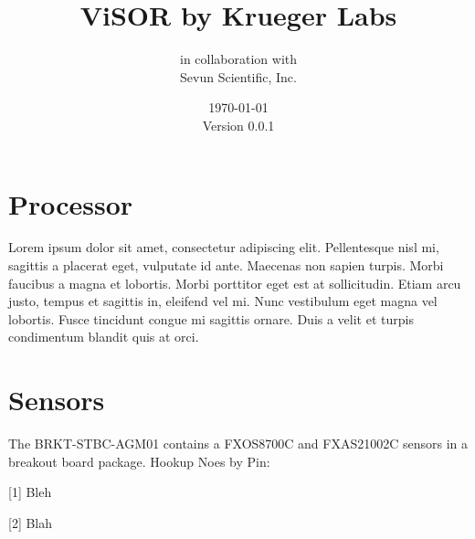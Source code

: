 \documentclass[letterpaper]{report}
\begin{document}
	\title{ViSOR by Krueger Labs}
	\author{in collaboration with \\ Sevun Scientific, Inc.}
	\date{\today \\ Version 0.0.1}
\maketitle


\newpage
\begin{versionhistory}
\end{versionhistory}

\newpage
\tableofcontents

\newpage
\listoffigures

\newpage
\listoftables

\newpage
{}
\setcounter{page}{1}

\chapter{Processor}
Lorem ipsum dolor sit amet, consectetur adipiscing elit. Pellentesque nisl mi, sagittis a placerat eget, vulputate id ante. Maecenas non sapien turpis. Morbi faucibus a magna et lobortis. Morbi porttitor eget est at sollicitudin. Etiam arcu justo, tempus et sagittis in, eleifend vel mi. Nunc vestibulum eget magna vel lobortis. Fusce tincidunt congue mi sagittis ornare. Duis a velit et turpis condimentum blandit quis at orci.

\chapter{Sensors}
The BRKT-STBC-AGM01 contains a FXOS8700C and FXAS21002C sensors in a breakout board package.  Hookup Noes by Pin:

[1] Bleh

[2] Blah
\end{document}

